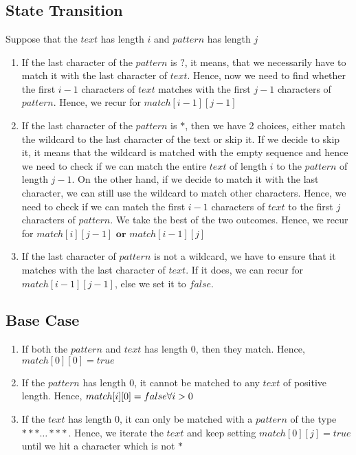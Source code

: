 \documentclass[12pt]{article}
\newcommand{\Or}{\textbf{ or }}
\begin{document}
\pagebreak
\section*{}

\subsection*{State Transition}
Suppose that the $text$ has length $i$ and $pattern$ has length $j$
\begin{enumerate}
    \item If the last character of the $pattern$ is $?$, it means, that we necessarily have to match it with the last character of $text$. Hence, now we need to find whether the first $i-1$ characters of $text$ matches with the first $j-1$ characters of $pattern$. Hence, we recur for $match[i-1][j-1]$
    
    \item If the last character of the $pattern$ is $*$, then we have 2 choices, either match the wildcard to the last character of the text or skip it. If we decide to skip it, it means that the wildcard is matched with the empty sequence and hence we need to check if we can match the entire $text$ of length $i$ to the $pattern$ of length $j-1$. On the other hand, if we decide to match it with the last character, we can still use the wildcard to match other characters. Hence, we need to check if we can match the first $i-1$ characters of $text$ to the first $j$ characters of $pattern$. We take the best of the two outcomes. Hence, we recur for $match[i][j-1] \Or match[i-1][j]$
    
    \item If the last character of $pattern$ is not a wildcard, we have to ensure that it matches with the last character of $text$. If it does, we can recur for $match[i-1][j-1]$, else we set it to $false$.
\end{enumerate}

\subsection*{Base Case}
\begin{enumerate}
    \item If both the $pattern$ and $text$ has length $0$, then they match. Hence, $match[0][0] = true$
    
    \item If the $pattern$ has length $0$, it cannot be matched to any $text$ of positive length. Hence, $match[i][0] = false \hfill \forall i > 0$
    
    \item If the $text$ has length $0$, it can only be matched with a $pattern$ of the type $***\dots***$. Hence, we iterate the $text$ and keep setting $match[0][j] = true$ until we hit a character which is not $*$
\end{enumerate}
\end{document}
